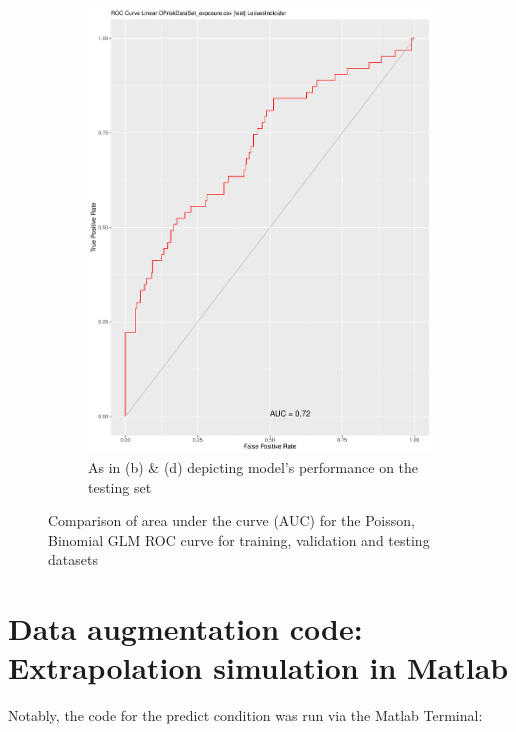 \documentclass[
]{article}
\begin{document}
\begin{figure}[t!]
\begin{subfigure}{0.48\textwidth}
\includegraphics[width=\linewidth]{BIN_ROC_Testing.pdf}
\caption{As in (b) \& (d) depicting model's performance on the testing set} \label{BIN_ROC_Test}
\end{subfigure}

\caption{Comparison of area under the curve (AUC) for the Poisson, Binomial GLM ROC curve for training, validation and testing datasets} \label{ROCCurveAll}
\end{figure}

\clearpage

\section{Data augmentation code: Extrapolation simulation in Matlab}
\label{sec:Data augmentation code: Extrapolation simulation in Matlab}

Notably, the code for the predict condition was run via the Matlab
Terminal:

\small
\end{document}
